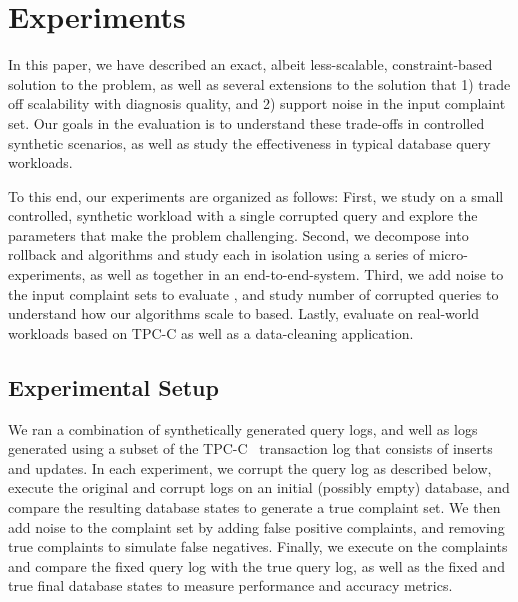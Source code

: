 
%
%
%
%
%
\section{Experiments}

In this paper, we have described an exact, albeit less-scalable,
constraint-based solution to the \prob problem, as well as several
extensions to the solution that 1) trade off scalability with
diagnosis quality, and 2) support noise in the input complaint set.
Our goals in the evaluation is to understand these trade-offs in
controlled synthetic scenarios, as well as study the effectiveness
in typical database query workloads.

To this end, our experiments are organized as follows: First, we
study \exact on a small controlled, synthetic workload with a single
corrupted query and explore the parameters that make the problem
challenging.  Second, we decompose \exact into rollback and \qfix algorithms and study each
in isolation using a series of micro-experiments, as well as together in an end-to-end-system.  
Third, we add noise to the input complaint sets to evaluate \density, and study
number of corrupted queries to understand how our algorithms scale to 
based.  Lastly, evaluate on real-world workloads based on TPC-C as
well as a data-cleaning application.




%
%

\subsection{Experimental Setup}

We ran a combination of synthetically generated query logs, and
well as logs generated using a subset of the TPC-C~\cite{tpcc}
transaction log that consists of inserts and updates.  In each
experiment, we corrupt the query log as described below, execute
the original and corrupt logs on an initial (possibly empty) database,
and compare the resulting database states to generate a true complaint
set.  We then add noise to the complaint set by adding false positive
complaints, and removing true complaints to simulate false negatives.
Finally, we execute \sys on the complaints and compare the fixed
query log with the true query log, as well as the fixed and true
final database states to measure performance and accuracy metrics.

